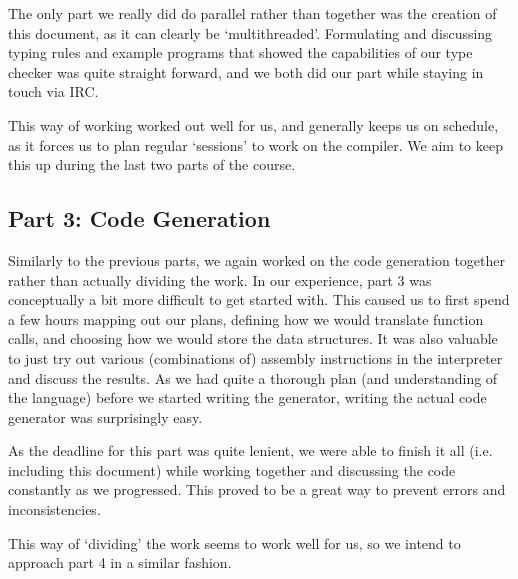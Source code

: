 \documentclass[a4paper]{article}
\begin{document}
The only part we really did do parallel rather than together was the creation of this document, as it can clearly be `multithreaded'. Formulating and discussing typing rules and example programs that showed the capabilities of our type checker was quite straight forward, and we both did our part while staying in touch via IRC.

This way of working worked out well for us, and generally keeps us on schedule, as it forces us to plan regular `sessions' to work on the compiler. We aim to keep this up during the last two parts of the course.

\subsection{Part 3: Code Generation}

Similarly to the previous parts, we again worked on the code generation together rather than actually dividing the work. In our experience, part 3 was conceptually a bit more difficult to get started with. This caused us to first spend a few hours mapping out our plans, defining how we would translate function calls, and choosing how we would store the data structures. It was also valuable to just try out various (combinations of) assembly instructions in the interpreter and discuss the results. As we had quite a thorough plan (and understanding of the language) before we started writing the generator, writing the actual code generator was surprisingly easy.

As the deadline for this part was quite lenient, we were able to finish it all (i.e. including this document) while working together and discussing the code constantly as we progressed. This proved to be a great way to prevent errors and inconsistencies.

This way of `dividing' the work seems to work well for us, so we intend to approach part 4 in a similar fashion.
\end{document}

